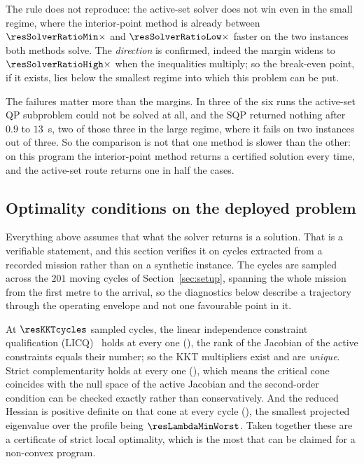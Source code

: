 \documentclass[11pt,a4paper]{article}
\begin{document}
The rule does not reproduce: the active-set solver does not win even in the small regime, where the
interior-point method is already between $\resSolverRatioMin\times$ and $\resSolverRatioLow\times$ faster on
the two instances both methods solve. The \emph{direction} is confirmed, indeed the margin widens to
$\resSolverRatioHigh\times$ when the inequalities multiply; so the break-even point, if it exists, lies below
the smallest regime into which this problem can be put.

The failures matter more than the margins. In three of the six runs the active-set QP subproblem could not
be solved at all, and the SQP returned nothing after $0.9$ to $13$~s, two of those three in the large
regime, where it fails on two instances out of three. So the comparison is not that one method is slower
than the other: on this program the interior-point method returns a certified solution every time, and the
active-set route returns one in half the cases.


\subsection{Optimality conditions on the deployed problem}
\label{sec:kkt}

Everything above assumes that what the solver returns is a solution. That is a verifiable statement, and this
section verifies it on cycles extracted from a recorded mission rather than on a synthetic instance. The
cycles are sampled across the $201$ moving cycles of Section~\ref{sec:setup}, spanning the whole mission
from the first metre to the arrival, so the diagnostics below describe a trajectory through the operating
envelope and not one favourable point in it.

\begin{table}[htbp]
  \centering
  \small
  \caption{%
  Optimality diagnostics at sampled cycles of the recorded mission. ``active'' counts equalities and
  active bounds together; ``rank'' is the rank of the Jacobian of the active constraints, so LICQ holds
  when the two coincide.}
  \label{res:tab:kkt}
\end{table}

At $\resKKTcycles$ sampled cycles, the linear independence constraint qualification (LICQ)~\cite{fagiano2025noc} holds at every one (\resLICQalways), the rank of the Jacobian of
the active constraints equals their number; so the KKT multipliers exist and are \emph{unique}. Strict
complementarity holds at every one (\resStrictAlways), which means the critical cone coincides with the null
space of the active Jacobian and the second-order condition can be checked exactly rather than
conservatively. And the reduced Hessian is positive definite on that cone at every cycle
(\resSOCalways), the smallest projected eigenvalue over the profile being $\resLambdaMinWorst$. Taken
together these are a certificate of strict local optimality, which is the most that can be claimed for a
non-convex program.
\end{document}
